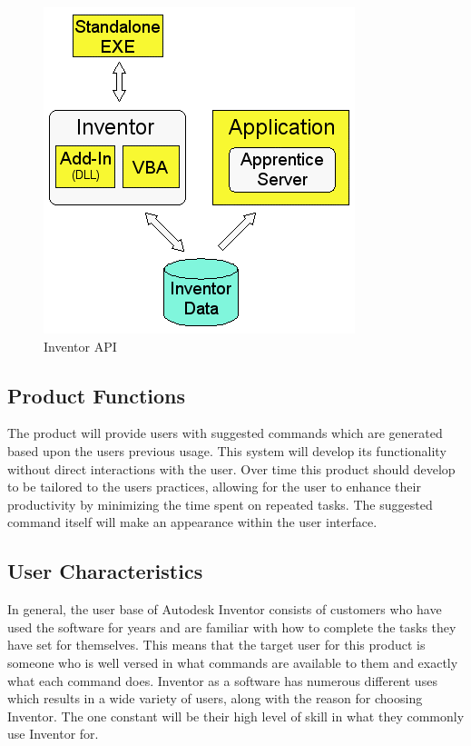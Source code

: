 \documentclass[onecolumn, draftclsnofoot,10pt, compsoc]{IEEEtran}
\begin{document}
    \begin{figure}[H]
        \centering
         \includegraphics{APIMethods.png}
        \caption{Inventor API}
        \label{fig:1}
    \end{figure}
   


\subsection{Product Functions}
The product will provide users with suggested commands which are generated based upon the users previous usage.  This system will develop its functionality without direct interactions with the user.  Over time this product should develop to be tailored to the users practices, allowing for the user to enhance their productivity by minimizing the time spent on repeated tasks. The suggested command itself will make an appearance within the user interface.

\subsection{User Characteristics}
In general, the user base of Autodesk Inventor consists of customers who have used the software for years and are familiar with how to complete the tasks they have set for themselves. This means that the target user for this product is someone who is well versed in what commands are available to them and exactly what each command does. Inventor as a software has numerous different uses which results in a wide variety of users, along with the reason for choosing Inventor. The one constant will be their high level of skill in what they commonly use Inventor for. 
\end{document}
